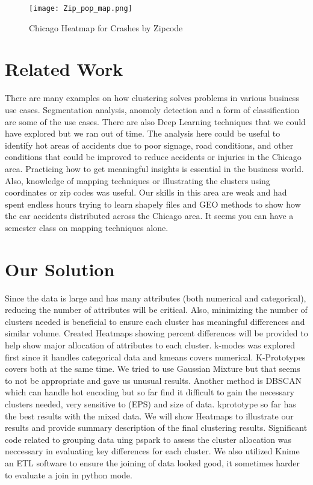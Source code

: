 \documentclass[conference]{IEEEtran}
\begin{document}
\begin{figure}[!h]
	\texttt{[image: Zip\_pop\_map.png]}
	\caption{Chicago Heatmap for Crashes by Zipcode}
	\label{fig: Chicago Heatmap for Crashes by Zipcode}
 \end{figure}

\section{Related Work}
There are many examples on how clustering solves problems in various business use cases.  Segmentation analysis, anomoly detection and a form of classification are some of the use cases. There are also Deep Learning techniques that we could have explored but we ran out of time.  The analysis here could be useful to identify hot areas of accidents due to poor signage, road conditions, and other conditions that could be improved to reduce accidents or injuries in the Chicago area.  Practicing how to get meaningful insights is essential in the business world.  Also, knowledge of mapping techniques or illustrating the clusters using coordinates or zip codes was useful.  Our skills in this area are weak and had spent endless hours trying to learn shapely files and GEO methods to show how the car accidents distributed across the Chicago area.  It seems you can have a semester class on mapping techniques alone.


\section{Our Solution}
Since the data is large and has many attributes (both numerical and categorical), reducing the number of attributes will be critical.  Also, minimizing the number of clusters needed is beneficial to ensure each cluster has meaningful differences and similar volume. Created Heatmaps showing percent differences will be provided to help show major allocation of attributes to each cluster. k-modes was explored first since it handles categorical data and kmeans covers numerical.  K-Prototypes covers both at the same time.  We tried to use Gaussian Mixture but that seems to not be appropriate and gave us unusual results.  Another method is DBSCAN which can handle hot encoding but so far find it difficult to gain the necessary clusters needed, very sensitive to (EPS) and size of data.  kprototype so far has the best results with the mixed data.  We will show Heatmaps to illustrate our results and provide summary description of the final clustering results.  Significant code related to grouping data uing pspark to assess the cluster allocation was neccessary in evaluating key differences for each cluster.  We also utilized Knime an ETL software to ensure the joining of data looked good,  it sometimes harder to evaluate a join in python mode.
\end{document}
